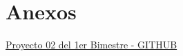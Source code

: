 \section{Anexos}

\href{https://github.com/Afkerian/Beijing-Multi-Site-Air-Quality-Data-Data-Set}{Proyecto 02 del 1er Bimestre - GITHUB}